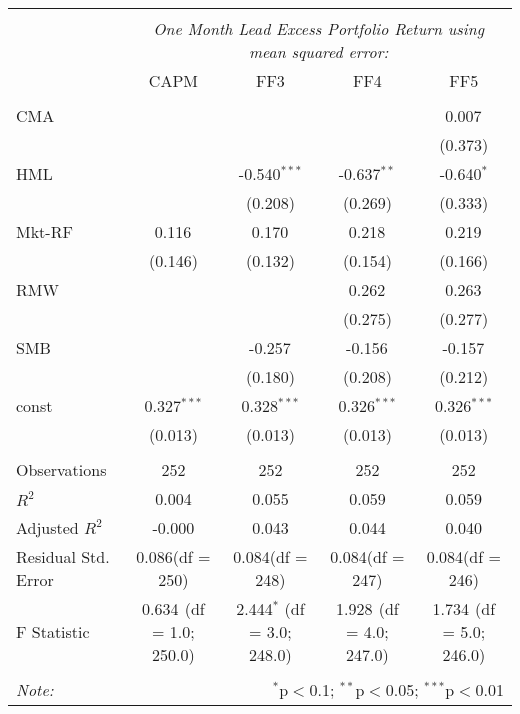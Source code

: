 \begin{table}[!htbp] \centering
\begin{tabular}{@{\extracolsep{5pt}}lcccc}
\\[-1.8ex]\hline
\hline \\[-1.8ex]
& \multicolumn{4}{c}{\textit{One Month Lead Excess Portfolio Return using mean squared error:}} \
\cr \cline{4-5}
\\[-1.8ex] & CAPM & FF3 & FF4 & FF5 \\
\hline \\[-1.8ex]
 CMA & & & & 0.007$^{}$ \\
  & & & & (0.373) \\
 HML & & -0.540$^{***}$ & -0.637$^{**}$ & -0.640$^{*}$ \\
  & & (0.208) & (0.269) & (0.333) \\
 Mkt-RF & 0.116$^{}$ & 0.170$^{}$ & 0.218$^{}$ & 0.219$^{}$ \\
  & (0.146) & (0.132) & (0.154) & (0.166) \\
 RMW & & & 0.262$^{}$ & 0.263$^{}$ \\
  & & & (0.275) & (0.277) \\
 SMB & & -0.257$^{}$ & -0.156$^{}$ & -0.157$^{}$ \\
  & & (0.180) & (0.208) & (0.212) \\
 const & 0.327$^{***}$ & 0.328$^{***}$ & 0.326$^{***}$ & 0.326$^{***}$ \\
  & (0.013) & (0.013) & (0.013) & (0.013) \\
\hline \\[-1.8ex]
 Observations & 252 & 252 & 252 & 252 \\
 $R^2$ & 0.004 & 0.055 & 0.059 & 0.059 \\
 Adjusted $R^2$ & -0.000 & 0.043 & 0.044 & 0.040 \\
 Residual Std. Error & 0.086(df = 250) & 0.084(df = 248) & 0.084(df = 247) & 0.084(df = 246)  \\
 F Statistic & 0.634$^{}$ (df = 1.0; 250.0) & 2.444$^{*}$ (df = 3.0; 248.0) & 1.928$^{}$ (df = 4.0; 247.0) & 1.734$^{}$ (df = 5.0; 246.0) \\
\hline
\hline \\[-1.8ex]
\textit{Note:} & \multicolumn{4}{r}{$^{*}$p$<$0.1; $^{**}$p$<$0.05; $^{***}$p$<$0.01} \\
\end{tabular}
\end{table}
